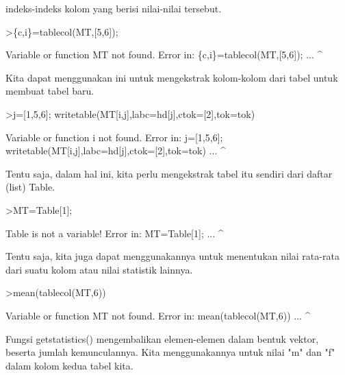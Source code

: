 \documentclass[a4paper,10pt]{article}
\begin{document}
\begin{eulernotebook}
\begin{eulercomment}
indeks-indeks kolom yang berisi nilai-nilai tersebut.
\end{eulercomment}
\begin{eulerprompt}
>\{c,i\}=tablecol(MT,[5,6]);
\end{eulerprompt}
\begin{euleroutput}
  Variable or function MT not found.
  Error in:
  \{c,i\}=tablecol(MT,[5,6]); ...
                   ^
\end{euleroutput}
\begin{eulercomment}
Kita dapat menggunakan ini untuk mengekstrak kolom-kolom dari tabel
untuk membuat tabel baru.
\end{eulercomment}
\begin{eulerprompt}
>j=[1,5,6]; writetable(MT[i,j],labc=hd[j],ctok=[2],tok=tok)
\end{eulerprompt}
\begin{euleroutput}
  Variable or function i not found.
  Error in:
  j=[1,5,6]; writetable(MT[i,j],labc=hd[j],ctok=[2],tok=tok) ...
                            ^
\end{euleroutput}
\begin{eulercomment}
Tentu saja, dalam hal ini, kita perlu mengekstrak tabel itu sendiri
dari daftar (list) Table.
\end{eulercomment}
\begin{eulerprompt}
>MT=Table[1];
\end{eulerprompt}
\begin{euleroutput}
  Table is not a variable!
  Error in:
  MT=Table[1]; ...
             ^
\end{euleroutput}
\begin{eulercomment}
Tentu saja, kita juga dapat menggunakannya untuk menentukan nilai
rata-rata dari suatu kolom atau nilai statistik lainnya.
\end{eulercomment}
\begin{eulerprompt}
>mean(tablecol(MT,6))
\end{eulerprompt}
\begin{euleroutput}
  Variable or function MT not found.
  Error in:
  mean(tablecol(MT,6)) ...
                  ^
\end{euleroutput}
\begin{eulercomment}
Fungsi getstatistics() mengembalikan elemen-elemen dalam bentuk
vektor, beserta jumlah kemunculannya. Kita menggunakannya untuk nilai
"m" dan "f" dalam kolom kedua tabel kita.
\end{eulercomment}
\begin{eulerprompt}

\end{eulerprompt}
\end{eulernotebook}
\end{document}
